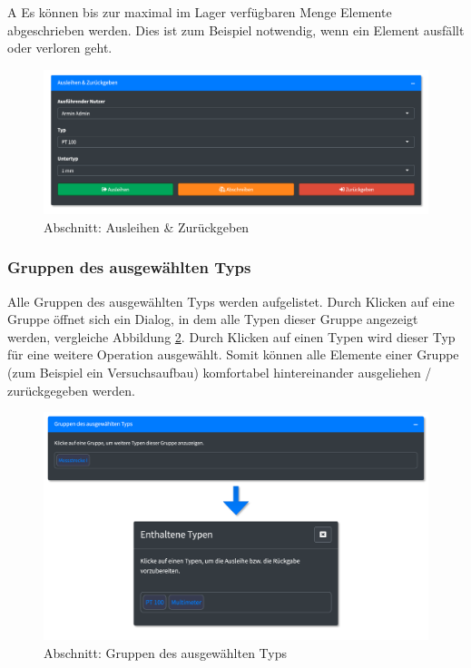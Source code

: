 \documentclass[
]{article}
\begin{document}
A Es können bis zur maximal im Lager verfügbaren Menge Elemente abgeschrieben werden. Dies ist zum Beispiel notwendig, wenn ein Element ausfällt oder verloren geht.

\begin{figure}
\centering
\includegraphics{./img/operate_detail_circulate.png}
\caption{\label{fig:operate-detail-circulate}Abschnitt: Ausleihen \& Zurückgeben}
\end{figure}

\hypertarget{gruppen-des-ausgewuxe4hlten-typs}{%
\subsubsection{Gruppen des ausgewählten Typs}\label{gruppen-des-ausgewuxe4hlten-typs}}

Alle Gruppen des ausgewählten Typs werden aufgelistet. Durch Klicken auf eine Gruppe öffnet sich ein Dialog, in dem alle Typen dieser Gruppe angezeigt werden, vergleiche Abbildung \ref{fig:operate-detail-groups}. Durch Klicken auf einen Typen wird dieser Typ für eine weitere Operation ausgewählt. Somit können alle Elemente einer Gruppe (zum Beispiel ein Versuchsaufbau) komfortabel hintereinander ausgeliehen / zurückgegeben werden.

\begin{figure}
\centering
\includegraphics{./img/operate_detail_groups.png}
\caption{\label{fig:operate-detail-groups}Abschnitt: Gruppen des ausgewählten Typs}
\end{figure}
\end{document}
